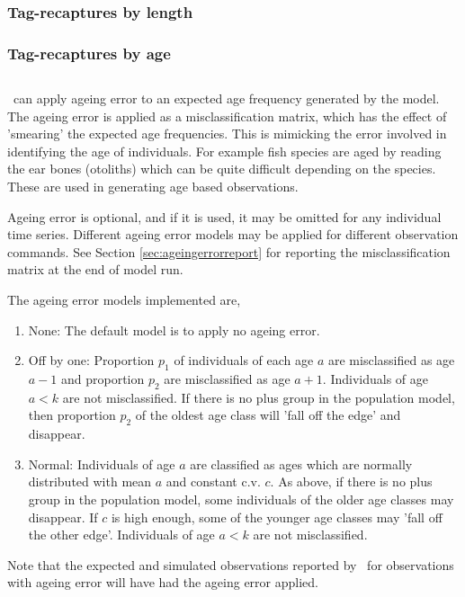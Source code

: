\subsubsection{Tag-recaptures by length}\label{subsubsec:tag_recap_by_length}


\subsubsection{Tag-recaptures by age}\label{subsubsec:tag_recap_by_age}


\subsection{}\label{subsec:ageing_error}
\IBM\ can apply ageing error to an expected age frequency generated by the model. The ageing error is applied as a misclassification matrix, which has the effect of 'smearing' the expected age frequencies. This is mimicking the error involved in identifying the age of individuals. For example fish species are aged by reading the ear bones (otoliths) which can be quite difficult depending on the species. These are used in generating age based observations. 

Ageing error is optional, and if it is used, it may be omitted for any individual time series. Different ageing error models may be applied for different observation commands. See Section \ref{sec:ageingerrorreport} for reporting the misclassification matrix at the end of model run.

The ageing error models implemented are,
\begin{enumerate}
	\item{None}: The default model is to apply no ageing error.
	\item{Off by one}: Proportion $p_1$ of individuals of each age $a$ are misclassified as age $a-1$ and proportion $p_2$ are misclassified as age $a+1$. Individuals of age $a < k$ are not misclassified. If there is no plus group in the population model, then proportion $p_2$ of the oldest age class will 'fall off the edge' and disappear. 
	\item{Normal}: Individuals of age $a$ are classified as ages which are normally distributed with mean $a$ and constant c.v. $c$. As above, if there is no plus group in the population model, some individuals of the older age classes may disappear. If $c$ is high enough, some of the younger age classes may 'fall off the other edge'. Individuals of age $a < k$ are not misclassified.
\end{enumerate}

Note that the expected and simulated observations reported by \IBM\ for observations with ageing error will have had the ageing error applied. 

